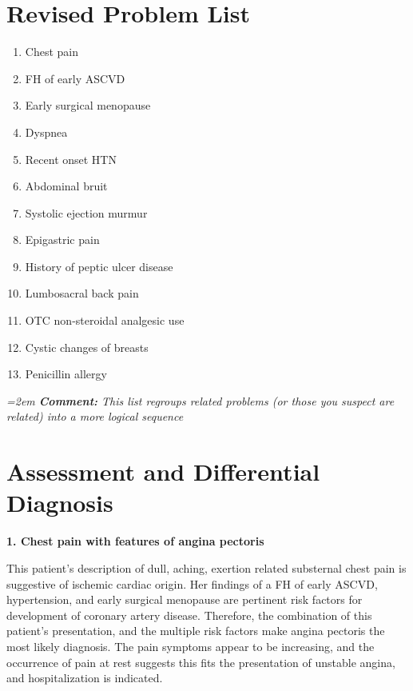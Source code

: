 \documentclass[11pt]{article}
\newcommand{\cm}[1]{%
  \par\nopagebreak\vspace{-0.2em}%
  \begingroup\small\itshape\color{cmtcolor}%
  \hangindent=2em \hangafter=0 \hspace*{1.2em}\textbf{Comment:} #1\par%
  \endgroup}
\newcommand{\lbl}[1]{\textbf{#1}\par\nopagebreak}
\begin{document}
\section*{Revised Problem List}

\begin{enumerate}[nosep,leftmargin=2em,label=\arabic*.]
  \item Chest pain
  \item FH of early ASCVD
  \item Early surgical menopause
  \item Dyspnea
  \item Recent onset HTN
  \item Abdominal bruit
  \item Systolic ejection murmur
  \item Epigastric pain
  \item History of peptic ulcer disease
  \item Lumbosacral back pain
  \item OTC non-steroidal analgesic use
  \item Cystic changes of breasts
  \item Penicillin allergy
\end{enumerate}
\cm{This list regroups related problems (or those you suspect are related) into a more logical sequence}

\section*{Assessment and Differential Diagnosis}

\lbl{1. Chest pain with features of angina pectoris}
This patient's description of dull, aching, exertion related substernal chest pain is suggestive of ischemic cardiac origin. Her findings of a FH of early ASCVD, hypertension, and early surgical menopause are pertinent risk factors for development of coronary artery disease. Therefore, the combination of this patient's presentation, and the multiple risk factors make angina pectoris the most likely diagnosis. The pain symptoms appear to be increasing, and the occurrence of pain at rest suggests this fits the presentation of unstable angina, and hospitalization is indicated.
\end{document}
